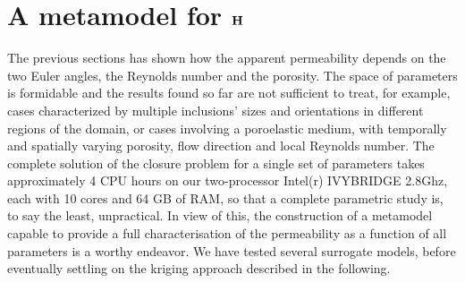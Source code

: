 \section{A metamodel for $\bf H$}

The previous sections has shown how the apparent permeability depends on  the two Euler angles, the Reynolds number and the porosity. The space 
of parameters is formidable and the results found so far are not sufficient to treat, for example, cases characterized by multiple inclusions'
sizes and orientations in different regions of the domain, or cases involving a poroelastic medium, with temporally and spatially varying 
porosity, flow direction and local Reynolds number. The complete solution of the closure problem for a single set of parameters takes 
approximately 4 CPU hours on our two-processor Intel(r) IVYBRIDGE 2.8Ghz, each with 10 cores and 64 GB of RAM, so that a complete parametric 
study is, to say the least, unpractical. In view of this, the construction of a metamodel capable to provide a full characterisation of the 
permeability as a function of all parameters is a worthy endeavor. We have tested several surrogate models, before eventually settling on the kriging 
approach \cite{Kleijnen20171} described in the following.





%


